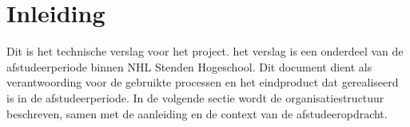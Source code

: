 \chapter{Inleiding}
Dit is het technische verslag voor het  project.
het verslag is een onderdeel van de afstudeerperiode binnen NHL Stenden Hogeschool.
Dit document dient als verantwoording voor de gebruikte processen en het eindproduct dat gerealiseerd is in de afstudeerperiode.
In de volgende sectie wordt de organisatiestructuur beschreven, samen met de aanleiding en de context van de afstudeeropdracht.


 

\newpage


